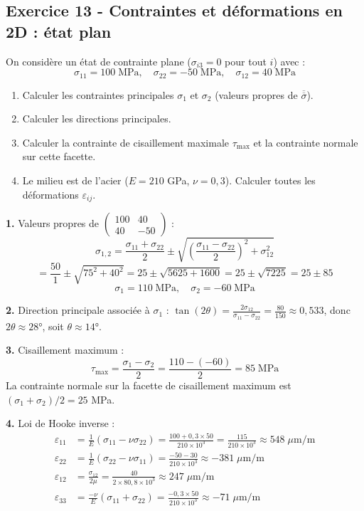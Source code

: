\documentclass[12pt,a4paper]{article}
\begin{document}
\subsection*{Exercice 13 - Contraintes et déformations en 2D : état plan \niveau{\moyen}}

\begin{boiteexercice}
On considère un état de contrainte plane ($\sigma_{i3}=0$ pour tout $i$) avec :
\[
\sigma_{11} = 100\;\text{MPa},\quad\sigma_{22} = -50\;\text{MPa},\quad\sigma_{12} = 40\;\text{MPa}
\]
\begin{enumerate}
  \item Calculer les contraintes principales $\sigma_1$ et $\sigma_2$ (valeurs propres de $\overline{\overline{\sigma}}$).
  \item Calculer les directions principales.
  \item Calculer la contrainte de cisaillement maximale $\tau_{\max}$ et la contrainte normale sur cette facette.
  \item Le milieu est de l'acier ($E=210$ GPa, $\nu=0{,}3$). Calculer toutes les déformations $\varepsilon_{ij}$.
\end{enumerate}
\end{boiteexercice}

\begin{boitecorrige}
\textbf{1.} Valeurs propres de $\begin{pmatrix}100&40\\40&-50\end{pmatrix}$ :
\[
\sigma_{1,2} = \frac{\sigma_{11}+\sigma_{22}}{2}\pm\sqrt{\left(\frac{\sigma_{11}-\sigma_{22}}{2}\right)^2+\sigma_{12}^2}
\]
\[
= \frac{50}{1}\pm\sqrt{75^2+40^2} = 25\pm\sqrt{5625+1600} = 25\pm\sqrt{7225} = 25\pm85
\]
\[
\sigma_1 = 110\;\text{MPa},\quad\sigma_2 = -60\;\text{MPa}
\]

\textbf{2.} Direction principale associée à $\sigma_1$ : $\tan(2\theta) = \frac{2\sigma_{12}}{\sigma_{11}-\sigma_{22}} = \frac{80}{150}\approx 0{,}533$, donc $2\theta\approx 28°$, soit $\theta\approx 14°$.

\textbf{3.} Cisaillement maximum :
\[
\tau_{\max} = \frac{\sigma_1-\sigma_2}{2} = \frac{110-(-60)}{2} = 85\;\text{MPa}
\]
La contrainte normale sur la facette de cisaillement maximum est $(\sigma_1+\sigma_2)/2 = 25$ MPa.

\textbf{4.} Loi de Hooke inverse :
\begin{align*}
\varepsilon_{11} &= \frac{1}{E}(\sigma_{11}-\nu\sigma_{22}) = \frac{100+0{,}3\times50}{210\times10^3} = \frac{115}{210\times10^3}\approx 548\;\mu\text{m/m}\\
\varepsilon_{22} &= \frac{1}{E}(\sigma_{22}-\nu\sigma_{11}) = \frac{-50-30}{210\times10^3}\approx -381\;\mu\text{m/m}\\
\varepsilon_{12} &= \frac{\sigma_{12}}{2\mu} = \frac{40}{2\times80{,}8\times10^3}\approx 247\;\mu\text{m/m}\\
\varepsilon_{33} &= \frac{-\nu}{E}(\sigma_{11}+\sigma_{22}) = \frac{-0{,}3\times50}{210\times10^3}\approx -71\;\mu\text{m/m}
\end{align*}
\end{boitecorrige}
\end{document}
